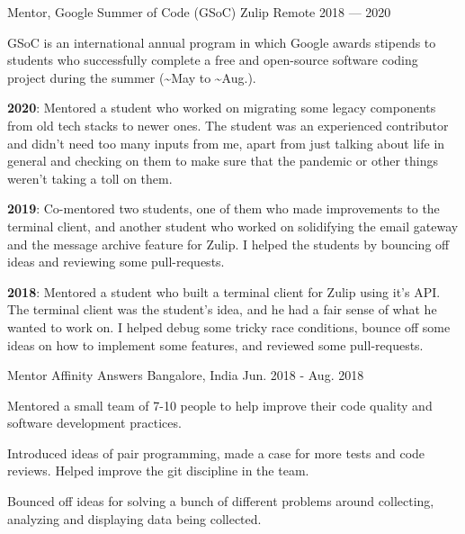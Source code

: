 
\begin{cventries}

  \cventry
      {Mentor, Google Summer of Code (GSoC)}
      {Zulip }
      {Remote} %
      {2018 --- 2020} %
      {
        \begin{cvitems} %
        \item {GSoC is an international annual program in which Google awards stipends to students who successfully complete a free and open-source software coding project during the summer (\textasciitilde May to \textasciitilde Aug.).}
        \item {\textbf{2020}: Mentored a student who worked on migrating some legacy components from old tech stacks to newer ones. The student was an experienced contributor and didn't need too many inputs from me, apart from just talking about life in general and checking on them to make sure that the pandemic or other things weren't taking a toll on them.}
        \item {\textbf{2019}: Co-mentored two students, one of them who made improvements to the terminal client, and another student who worked on solidifying the email gateway and the message archive feature for Zulip. I helped the students by bouncing off ideas and reviewing some pull-requests.}
        \item {\textbf{2018}: Mentored a student who built a terminal client for Zulip using it's API. The terminal client was the student's idea, and he had a fair sense of what he wanted to work on. I helped debug some tricky race conditions, bounce off some ideas on how to implement some features, and reviewed some pull-requests.}
        \end{cvitems}
      }
  \cventry
      {Mentor}
      {Affinity Answers }
      {Bangalore, India} %
      {Jun. 2018 - Aug. 2018} %
      {
        \begin{cvitems} %
        \item {Mentored a small team of 7-10 people to help improve their code quality and software development practices.}
        \item {Introduced ideas of pair programming, made a case for more tests and code reviews. Helped improve the git discipline in the team.}
        \item {Bounced off ideas for solving a bunch of different problems around collecting, analyzing and displaying data being collected.}
        \end{cvitems}
      }
\end{cventries}
